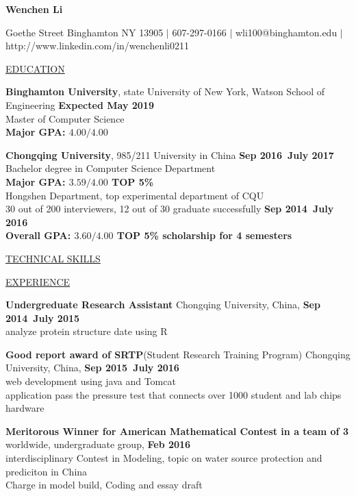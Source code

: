 \documentclass{article}
\begin{document}
\begin{center}
\large{\textbf{Wenchen Li} \par}
\end{center}

 Goethe Street Binghamton NY 13905 $|$
607-297-0166 $|$
wli100@binghamton.edu $|$
http://www.linkedin.com/in/wenchenli0211


\noindent
\uline{EDUCATION}

\noindent
\textbf{Binghamton University}, state University of New York, Watson School of Engineering
\hfill \textbf{Expected May 2019} \\
Master of Computer Science \\
\indent \textbf{Major GPA: $4.00/4.00$}

\noindent
\textbf{Chongqing University}, 985/211 University in China
\hfill \textbf{Sep 2016~July 2017} \\
Bachelor degree in Computer Science Department \\
\indent \textbf{Major GPA: $3.59/4.00$ \textbar TOP 5\% } \\
Hongshen Department, top experimental department of CQU \\
30 out of 200 interviewers, 12 out of 30 graduate successfully
\hfill \textbf{Sep 2014~July 2016} \\
\indent \textbf{Overall GPA: $3.60/4.00$ \textbar  TOP 5\% \textbar  scholarship for 4 semesters }


\noindent
\uline{TECHNICAL SKILLS}

\noindent
\uline{EXPERIENCE}

\noindent
\textbf{Undergreduate Research Assistant}
\hfill Chongqing University, China, \textbf{Sep 2014~July 2015} \\
    \indent analyze protein structure date using R

\noindent
\textbf{Good report award of SRTP}(Student Research Training Program)
\hfill Chongqing University, China, \textbf{Sep 2015~July 2016} \\
    \indent web development using java and Tomcat \\
    \indent application pass the pressure test that connects over 1000 student and lab chips hardware

\noindent
\textbf{Meritorous Winner for American Mathematical Contest in a team of 3}
\hfill worldwide, undergraduate group, \textbf{Feb 2016} \\
    \indent interdisciplinary Contest in Modeling, topic on water source protection and prediciton in China\\
    \indent Charge in model build, Coding and essay draft
\end{document}
